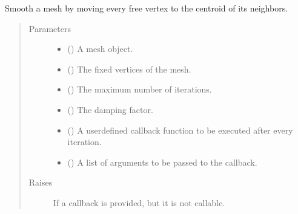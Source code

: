 \documentclass[letterpaper,10pt,english]{sphinxmanual}
\begin{document}
\begin{fulllineitems}
\begin{fulllineitems}
\label{\detokenize{api/generated/directional_clustering.mesh.MeshPlus.smooth_centroid:directional_clustering.mesh.MeshPlus.smooth_centroid}}
Smooth a mesh by moving every free vertex to the centroid of its neighbors.
\begin{quote}\begin{description}
\item[{Parameters}] \leavevmode\begin{itemize}
\item {} 
 () \textendash{} A mesh object.

\item {} 
 () \textendash{} The fixed vertices of the mesh.

\item {} 
 () \textendash{} The maximum number of iterations.

\item {} 
 () \textendash{} The damping factor.

\item {} 
 () \textendash{} A user\sphinxhyphen{}defined callback function to be executed after every iteration.

\item {} 
 () \textendash{} A list of arguments to be passed to the callback.

\end{itemize}

\item[{Raises}] \leavevmode
{} \textendash{} If a callback is provided, but it is not callable.

\end{description}\end{quote}

\end{fulllineitems}
\end{fulllineitems}
\end{document}
